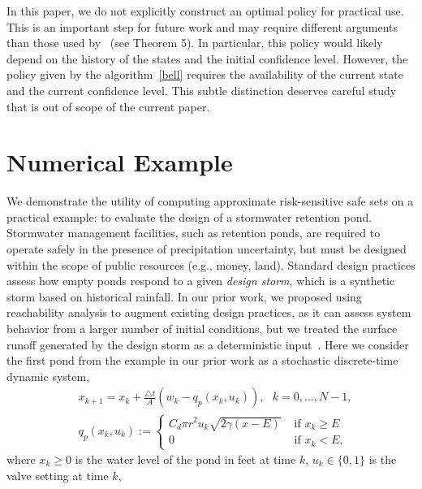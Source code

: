 \documentclass[letterpaper, 10 pt, conference]{ieeeconf}  %
\begin{document}
In this paper, we do not explicitly construct an optimal policy for practical use.
This is an important step for future work and may require different arguments 
than those used by~\cite{chow2015risk} (see Theorem 5). In particular, this policy would likely depend 
on the history of the states and the initial confidence level. However, the policy given by the algorithm~\eqref{bell}
requires the availability of the current state and the current confidence level. 
This subtle distinction deserves careful study that is out of scope of the current paper.


\section{Numerical Example}
\label{sec::ex}
We demonstrate the utility of computing approximate risk-sensitive safe sets on a practical example:
to evaluate the design of a stormwater retention pond. 
Stormwater management facilities, such as retention ponds, are required to operate safely 
in the presence of precipitation uncertainty, but must be designed within the scope of public resources (e.g., money, land). 
Standard design practices assess how empty ponds respond to a given \textit{design storm},
which is a synthetic storm based on historical rainfall.  
In our prior work, we proposed using reachability analysis to augment existing design practices, as it can assess 
system behavior from a larger number of initial conditions, but we treated the surface runoff generated by the design storm as a deterministic input~\cite{sustech}.
Here we consider the first pond from the example in our prior work as a stochastic discrete-time dynamic system,
\begin{equation}\begin{aligned}
& x_{k+1} = x_k + \frac{\triangle t}{A} (w_k - q_p(x_k, u_k)), \text{ }k = 0, \dots, N-1, \\
& q_p(x_k,u_k) := \begin{cases} C_d \pi r^2 u_k \sqrt{ 2\gamma(x-E) } & \text{ if } x_k \geq E \\
						0 & \text{ if } x_k < E, \end{cases}
\end{aligned}\label{watersys}\end{equation}
where $x_k \geq 0$ is the water level of the pond in feet at time $k$, $u_k \in \{0, 1\}$ is the valve setting at time $k$,
\end{document}
